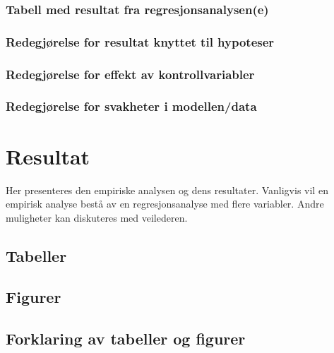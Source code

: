 \documentclass[
  12pt,
  a4paper,
  DIV=11,
  numbers=noendperiod]{scrartcl}
\begin{document}
\subsubsection{Tabell med resultat fra
regresjonsanalysen(e)}\label{tabell-med-resultat-fra-regresjonsanalysene}

\subsubsection{Redegjørelse for resultat knyttet til
hypoteser}\label{redegjuxf8relse-for-resultat-knyttet-til-hypoteser}

\subsubsection{Redegjørelse for effekt av
kontrollvariabler}\label{redegjuxf8relse-for-effekt-av-kontrollvariabler}

\subsubsection{Redegjørelse for svakheter i
modellen/data}\label{redegjuxf8relse-for-svakheter-i-modellendata}

\newpage

\section{Resultat}\label{resultat}

Her presenteres den empiriske analysen og dens resultater. Vanligvis vil
en empirisk analyse bestå av en regresjonsanalyse med flere variabler.
Andre muligheter kan diskuteres med veilederen.

\subsection{Tabeller}\label{tabeller}

\subsection{Figurer}\label{figurer}

\subsection{Forklaring av tabeller og
figurer}\label{forklaring-av-tabeller-og-figurer}

\newpage
\end{document}

